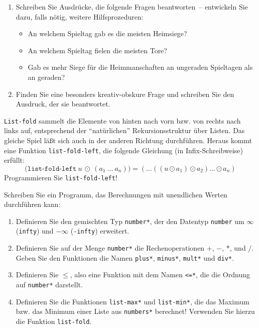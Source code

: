 \begin{aufgabe}
\begin{enumerate}
  \item Schreiben Sie Ausdrücke, die folgende Fragen beantworten~--
  entwickeln Sie dazu, falls nötig, weitere Hilfsprozeduren:
  \begin{itemize}
    \item An welchem Spieltag gab es die meisten Heimsiege?
    \item An welchem Spieltag fielen die meisten Tore?
    \item Gab es mehr Siege für die Heimmanschaften an ungeraden Spieltagen als an
      geraden?
    \end{itemize}
    
  \item Finden Sie eine besonders
    kreativ-obskure Frage und schreiben Sie den Ausdruck, der sie
    beantwortet.
\end{enumerate} 

\end{aufgabe}

\begin{aufgabe}
  \texttt{List-fold} sammelt die Elemente von hinten nach vorn bzw.
  von rechts nach links auf, entsprechend der "`natürlichen"'
  Rekursionsstruktur über Listen.  Das gleiche Spiel läßt sich auch in
  der anderen Richtung durchführen.  Heraus kommt eine Funktion
  \texttt{list-fold-left}, die folgende Gleichung (in
  Infix-Schreibweise) erfüllt:
  \begin{displaymath}
    \texttt{(list-fold-left}~u~\odot~(a_1~\ldots~a_n)\texttt{)}
    = (\ldots((u\odot a_1)\odot a_2)\ldots\odot a_n)
  \end{displaymath}
  Programmieren Sie \texttt{list-fold-left}!
\end{aufgabe}


\begin{aufgabe}
  Schreiben Sie ein Programm, das Berechnungen
  mit unendlichen Werten durchführen kann:
  
  \begin{enumerate}
  \item Definieren Sie den gemischten Typ \texttt{number*}, der den
    Datentyp \texttt{number} um $\infty$ (\texttt{infty}) und $- \infty$
    (\texttt{-infty}) erweitert.
  \item Definieren Sie auf der Menge \texttt{number*} die
    Rechenoperationen $+$, $-$, $*$, und $/$.  Geben Sie den Funktionen
    die Namen \texttt{plus*}, \texttt{minus*}, \texttt{mult*} und
    \texttt{div*}.
  \item Definieren Sie $\leq$, also eine Funktion mit dem
    Namen \texttt{<=*}, die die Ordnung auf \texttt{number*} darstellt.
  \item Definieren Sie die Funktionen \texttt{list-max*} und
    \texttt{list-min*}, die das Maximum bzw. das Minimum einer Liste 
    aus \texttt{numbers*} berechnet!  Verwenden Sie hierzu die Funktion \texttt{list-fold}.
  \end{enumerate}
\end{aufgabe}

